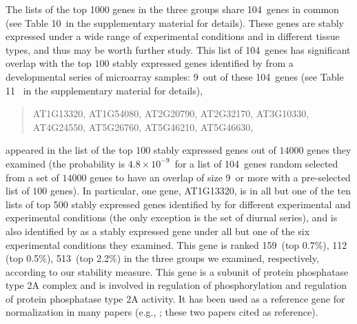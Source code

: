 \documentclass[letterpaper,12pt]{article}
\newcommand{\overlapGene}{104~}
\newcommand{\overlapGeneCze}{9~}
\newcommand{\overlapProb}{$4.8\times 10^{-9}$~}
\newcommand{\rankInSeedling}{159~}
\newcommand{\rankInLeaf}{112~}
\newcommand{\rankInTissue}{513~}
\newcommand{\rankTopPctSeedling}{0.7\%}
\newcommand{\rankTopPctLeaf}{0.5\%}
\newcommand{\rankTopPctTissue}{2.2\%}
\newcommand{\supptablethree}{10~}
\newcommand{\supptablefour}{11~}
\begin{document}
	The lists of the top 1000 genes in the three groups share \overlapGene genes in common (see 
	Table \supptablethree in the 
	supplementary material for details).  These
	genes are stably expressed under a wide range of experimental conditions and
	in different tissue types, and thus may be worth further study. This list of
	\overlapGene genes has significant overlap with the top $100$ stably expressed genes
	identified by \citeauthor{czechowski2005genome} from a developmental series of
	microarray samples: \overlapGeneCze out of these \overlapGene genes (see Table \supptablefour 
	in the
	supplementary material for details),
	\begin{center}
		\begin{quote}
			AT1G13320, AT1G54080, AT2G20790, AT2G32170, AT3G10330,\\
			AT4G24550, AT5G26760, AT5G46210, AT5G46630, \\
		\end{quote}
	\end{center}
	appeared in the list of the top $100$ stably expressed genes
	out of $14000$ genes they examined (the probability is \overlapProb for
	a list of \overlapGene genes random selected from a set of $14000$ genes to have an
	overlap of size \overlapGeneCze or more with a pre-selected list of $100$ genes). In
	particular, one gene, AT1G13320, is in all but one of the ten lists of top 500 stably
	expressed genes identified by \citeauthor{czechowski2005genome} for different
	experimental and experimental conditions (the only exception is the set of
	diurnal series), and is also identified by
	\cite{hong2010identification} as a stably expressed gene under all but one of the six
	experimental conditions they examined.  This gene is ranked \rankInSeedling (top 
	\rankTopPctSeedling), \rankInLeaf
	(top \rankTopPctLeaf), \rankInTissue (top \rankTopPctTissue) in the three
	groups we examined, respectively, according to our stability measure.
	This gene is a subunit of protein phosphatase type 2A complex and is involved in
	regulation of phosphorylation and regulation of protein phosphatase type 2A
	activity. It has been used as a reference gene for normalization in many
	papers (e.g., \citet{baron2012transcriptional,bournier2013arabidopsis};
	these two papers cited \citeauthor{czechowski2005genome} as reference). 
	
\end{document}
